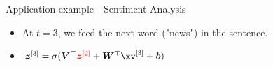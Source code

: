 \documentclass[11pt,compress,t,notes=noshow]{beamer}
\begin{document}
\begin{frame} {Application example - Sentiment Analysis}
  \begin{itemize}
    \item At $t = 3$, we feed the next word ("news") in the sentence.
    \item $\bm{z}^{[3]} = \sigma(\bm{V}^\top\textcolor{red}{\bm{z}^{[2]}} + \bm{W}^\top \xv^{[3]} + \bm{b})$
  \end{itemize}
  \begin{figure}
      \centering
  \end{figure}
\end{frame}
\end{document}
